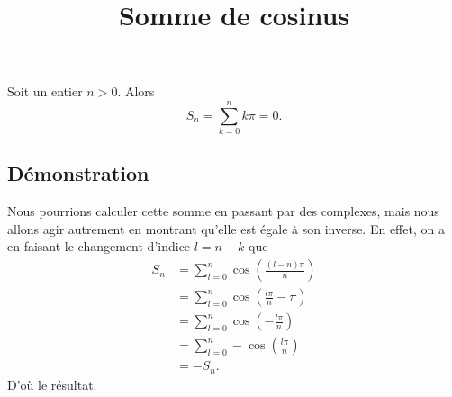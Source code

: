 \documentclass[fontsize=12pt,twoside=false,parskip=half]{scrartcl}
\title{Somme de cosinus}
\date{}
\author{}
\begin{document}
\maketitle
   \begin{Theoreme}
      Soit un entier $n > 0$. Alors
      \begin{equation}
         S_n = \sum_{k = 0}^n k \pi = 0.
      \end{equation}
   \end{Theoreme}
   \subsection{Démonstration}
       Nous pourrions calculer cette somme en passant par des complexes, mais
       nous allons agir autrement en montrant qu'elle est égale à son inverse.
       En effet, on a en faisant le changement d'indice $l = n - k$ que
       \begin{align*}
           S_n &= \sum_{l = 0}^{n} \cos\left( \frac{(l - n)\pi}{n} \right)\\
               &= \sum_{l = 0}^{n} \cos\left(\frac{l\pi}{n} - \pi \right)\\
               &= \sum_{l = 0}^{n} \cos\left(-\frac{l\pi}{n} \right)\\
               &= \sum_{l = 0}^{n} -\cos\left(\frac{l\pi}{n} \right)\\
               &= -S_n.
       \end{align*}
       D'où le résultat.
\end{document}
